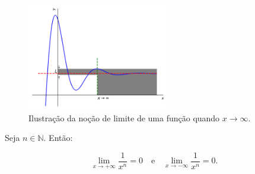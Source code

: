\cleardoublepage\documentclass[../main.tex]{subfiles}
\begin{document}
\begin{figure}[H]
  \centering
  \includegraphics[width=0.55\textwidth]{fig_lim/fig_lim_x2infty}
  \caption{Ilustração da noção de limite de uma função quando $x\to \infty$.}
  \label{fig:lim_x2infty}
\end{figure}
\begin{framed}
\begin{teo}
Seja \(n\in \mathbb{N}\). Então:

\[ \lim\limits_{x \to +\infty}\dfrac{1}{x^n}=0\quad \mbox{e}\quad \lim\limits_{x \to -\infty}\dfrac{1}{x^n}=0. \]
\end{teo}
\end{framed}
\end{document}
